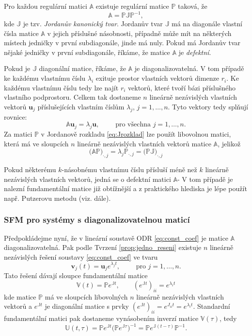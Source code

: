\documentclass[a4paper, 12pt]{book}
\theoremstyle{definition}
\def\vc#1{\mathbf{\boldsymbol{#1}}}     %
\def\tn#1{{\mathbb{#1}}}    %
\def\df#1{\emph{#1}}
\begin{document}
Pro každou regulární matici $\tn A$ existuje regulární matice $\tn P$ taková, že
\begin{equation}
   \label{eq:Jrozklad}
   \tn A = \tn P \tn J \tn P^{-1},
\end{equation}
kde $\tn J$ je tzv. \df{Jordanův kanonický tvar}. Jordanův tvar $\tn J$ 
má na diagonále vlastní čísla matice $\tn A$ v jejich příslušné násobnosti, případně může mít na některých místech jedničky v první subdiagonále, jinde má nuly.
Pokud má Jordanův tvar nějaké jedničky v první subdiagonále, říkáme, že matice $\tn A$ je \df{defektní}. 

Pokud je $\tn J$ diagonální matice, říkáme, že $\tn A$ je diagonalizovatelná. V tom případě ke každému vlastnímu číslu $\lambda_i$ exituje prostor vlastních vektorů dimenze $r_i$.
Ke každému vlastnímu číslu tedy lze najít $r_i$ vektorů, které tvoří bázi příslušného 
vlastního podprostoru. Celkem tak dostaneme $n$ lineárně nezávislých vlastních vektorů
$\vc u_j$ příslušejících vlastním číslům $\lambda_j$, $j=1,\dots, n$. Tyto vektory tedy splňují rovnice:
\[
   \tn A \vc u_j = \lambda_j \vc u, \qquad \text{ pro všechna } j=1,\dots, n.
\]
Za matici $\tn P$ v Jordanově rozkladu \eqref{eq:Jrozklad} lze použít libovolnou matici, která má ve sloupcích $n$ lineárně nezávislých vlastních vektorů matice $\tn A$, jelikož
\[
    \big( \tn A \tn P \big)_{\cdot, j} = \lambda_j \tn P_{\cdot, j} = \big(\tn P \tn J\big)_{\cdot, j}
\]    

Pokud některému $k$-násobnému vlastnímu číslu přísluší méně než $k$ lineárně nezávislých vlastních vektorů, jedná se o defektní matici $\tn A$- V tom případě 
je nalezní fundamentální matice již obtížnější a z praktického hlediska je lépe použít např. Putzerovu metodu (viz. dále).

\subsubsection{SFM pro systémy s diagonalizovatelnou maticí}
Předpokládejme nyní, že v lineární soustavě ODR \eqref{eq:const_coef} je matice $\tn A$ diagonalizovatelná.
Pak podle Tvrzení \eqref{prop:jedno_reseni}
existuje $n$ lineárně nezávislých řešení soustavy \eqref{eq:const_coef} ve tvaru 
\[
    \vc v_j(t)= \vc u_j e^{\lambda_j t},\qquad \text{ pro } j=1,\dots, n.
\]
Tato řešení dávají sloupce fundamentální matice
\[
    \tn V(t) = \tn P e^{\tn J t},\qquad (e^{\tn Jt})_{ii} = e^{\lambda_i t}
\]
kde matice $\tn P$ má ve sloupcích libovolných $n$ lineárně nezávislých vlastních vektorů
a $e^{\tn Jt}$ je diagonální matice s prvky $(e^{\tn Jt})_{ii} = e^{J_{ii} t} = e^{\lambda_i t}$. 
Standardní fundamentální matici pak dostaneme vynásobením inverzí matice $\tn V(\tau)$, tedy
\[
  \tn U(t, \tau) = \tn P e^{\tn J t} \big(\tn P e^{\tn J \tau} \big)^{-1} = \tn P e^{\tn J(t-\tau)} \tn P^{-1}.
\]
\end{document}
